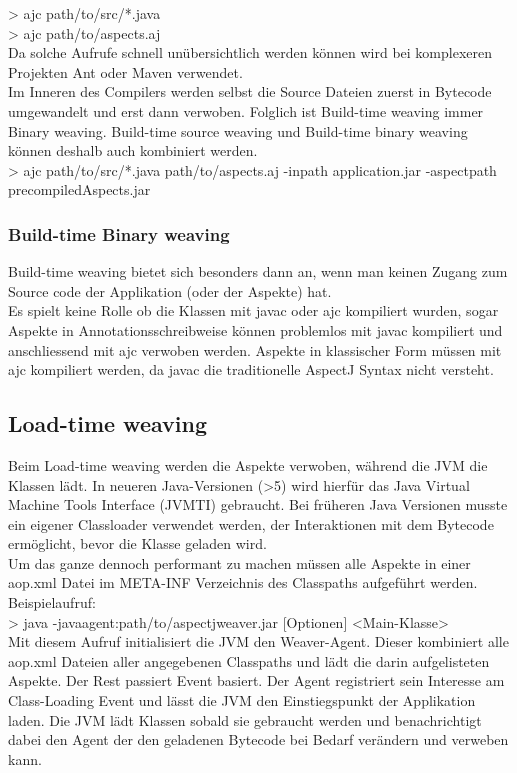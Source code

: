 > ajc path/to/src/*.java\\

> ajc path/to/aspects.aj\\

Da solche Aufrufe schnell unübersichtlich werden können wird bei komplexeren Projekten Ant oder Maven verwendet.\\
Im Inneren des Compilers werden selbst die Source Dateien zuerst in Bytecode umgewandelt und erst dann verwoben. Folglich ist Build-time weaving immer Binary weaving. Build-time source weaving und Build-time binary weaving können deshalb auch kombiniert werden.\\
> ajc path/to/src/*.java path/to/aspects.aj -inpath application.jar -aspectpath precompiledAspects.jar

\subsubsection*{Build-time Binary weaving}
Build-time weaving bietet sich besonders dann an, wenn man keinen Zugang zum Source code der Applikation (oder der Aspekte) hat.\\
Es spielt keine Rolle ob die Klassen mit javac oder ajc kompiliert wurden, sogar Aspekte in Annotationsschreibweise können problemlos mit javac kompiliert und anschliessend mit ajc verwoben werden. Aspekte in klassischer Form müssen mit ajc kompiliert werden, da javac die traditionelle AspectJ Syntax nicht versteht.

\subsection{Load-time weaving}

Beim Load-time weaving werden die Aspekte verwoben, während die JVM die Klassen lädt. In neueren Java-Versionen (>5) wird hierfür das Java Virtual Machine Tools Interface (JVMTI) gebraucht. Bei früheren Java Versionen musste ein eigener Classloader verwendet werden, der Interaktionen mit dem Bytecode ermöglicht, bevor die Klasse geladen wird.\\
Um das ganze dennoch performant zu machen müssen alle Aspekte in einer aop.xml Datei im META-INF Verzeichnis des Classpaths aufgeführt werden.\\

Beispielaufruf:\\
> java -javaagent:path/to/aspectjweaver.jar [Optionen] <Main-Klasse>\\
Mit diesem Aufruf initialisiert die JVM den Weaver-Agent.
Dieser kombiniert alle aop.xml Dateien aller angegebenen Classpaths und lädt die darin aufgelisteten Aspekte. Der Rest passiert Event basiert. Der Agent registriert sein Interesse am Class-Loading Event und lässt die JVM den Einstiegspunkt der Applikation laden. Die JVM lädt Klassen sobald sie gebraucht werden und benachrichtigt dabei den Agent der den geladenen Bytecode bei Bedarf verändern und verweben kann.

